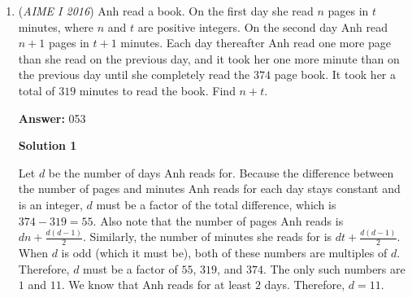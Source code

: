 \begin{enumerate}
 
 \textbf{Answer: }108



\textbf{Solution 1}

Let $B$ and $C$ be the vertices adjacent to $A$ on the same base as $A$, and let $D$ be the last vertex of the triangular pyramid.  Then $\angle CAB = 120^\circ$. Let $X$ be the foot of the altitude from $A$ to $\overline{BC}$. Then since $\triangle ABX$ is a $30-60-90$ triangle, $AX = 6$.  Since the dihedral angle between $\triangle ABC$ and $\triangle BCD$ is $60^\circ$, $\triangle AXD$ is a $30-60-90$ triangle and $AD = 6\sqrt{3} = h$. Thus $h^2 = \boxed{108}$.

 



\textbf{Solution 2}

Let $B$ and $C$ be the vertices adjacent to $A$ on the same base as $A$, and let $D$ be the last vertex of the triangular pyramid. Notice that we can already find some lengths. We have $AB=AC=12$ (given) and $BC=BD=\sqrt{144+h^2}$ by the Pythagorean Theorem. Let $M$ be the midpoint of $BC$. Then, we have $AM=6$ ($30-60-90$) triangles and $DM=\sqrt{36+h^2}$ by the Pythagorean Theorem. Applying the Law of Cosines, since $\angle AMD=60^{\circ}$, we get 
 \[h^2=36+h^2+36-\frac12 \cdot 12 \sqrt{36+h^2} \implies h^2=\boxed{108},\] as desired.

 -someone

 


	\item (\textit{AIME I 2016}) Anh read a book. On the first day she read $n$ pages in $t$ minutes, where $n$ and $t$ are positive integers. On the second day Anh read $n + 1$ pages in $t + 1$ minutes. Each day thereafter Anh read one more page than she read on the previous day, and it took her one more minute than on the previous day until she completely read the $374$ page book. It took her a total of $319$ minutes to read the book. Find $n + t$.


 
 \textbf{Answer: }053



\textbf{Solution 1}

Let $d$ be the number of days Anh reads for.  Because the difference between the number of pages and minutes Anh reads for each day stays constant and is an integer, $d$ must be a factor of the total difference, which is $374-319=55$.  Also note that the number of pages Anh reads is $dn+\frac{d(d-1)}{2}$.  Similarly, the number of minutes she reads for is $dt+\frac{d(d-1)}{2}$.  When $d$ is odd (which it must be), both of these numbers are multiples of $d$.  Therefore, $d$ must be a factor of $55$, $319$, and $374$.  The only such numbers are $1$ and $11$.  We know that Anh reads for at least $2$ days. Therefore, $d=11$.


\end{enumerate}
